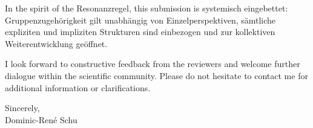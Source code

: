 \documentclass[a4paper,12pt]{article}
\begin{document}
	In the spirit of the Resonanzregel, this submission is systemisch eingebettet: Gruppenzugehörigkeit gilt unabhängig von Einzelperspektiven, sämtliche expliziten und impliziten Strukturen sind einbezogen und zur kollektiven Weiterentwicklung geöffnet.
	
	I look forward to constructive feedback from the reviewers and welcome further dialogue within the scientific community. Please do not hesitate to contact me for additional information or clarifications.
	
	\vspace{1cm}
	
	Sincerely,\\[2em]
	
	Dominic-René Schu
	
\end{document}
